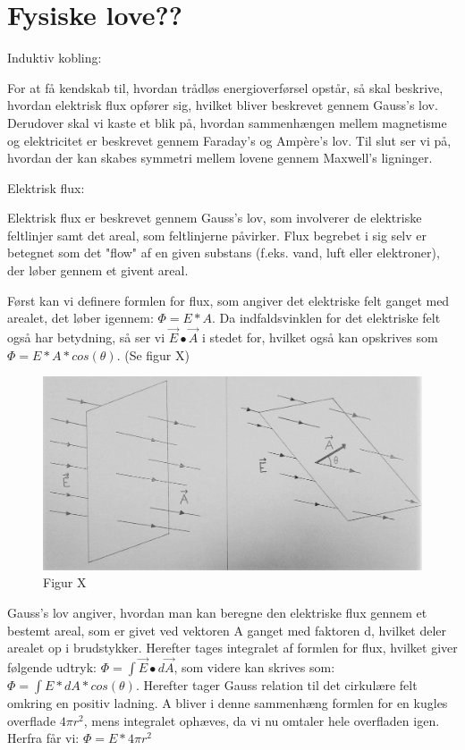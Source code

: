 \section{Fysiske love??}

Induktiv kobling:

For at få kendskab til, hvordan trådløs energioverførsel opstår, så skal beskrive, hvordan elektrisk flux opfører sig, hvilket bliver beskrevet gennem Gauss's lov. Derudover skal vi kaste et blik på, hvordan sammenhængen mellem magnetisme og elektricitet er beskrevet gennem Faraday's og Ampère's lov. Til slut ser vi på, hvordan der kan skabes symmetri mellem lovene gennem Maxwell's ligninger.

Elektrisk flux:

Elektrisk flux er beskrevet gennem Gauss's lov, som involverer de elektriske feltlinjer samt det areal, som feltlinjerne påvirker. Flux begrebet i sig selv er betegnet som det "flow" af en given substans (f.eks. vand, luft eller elektroner), der løber gennem et givent areal.

Først kan vi definere formlen for flux, som angiver det elektriske felt ganget med arealet, det løber igennem: $\Phi = E * A$. Da indfaldsvinklen for det elektriske felt også har betydning, så ser vi $\vec{E} \bullet \vec{A}$ i stedet for, hvilket også kan opskrives som $\Phi = E * A * cos(\theta)$. (Se figur X)

\begin{figure}[H]
\centering
\includegraphics[scale=0.5]{Vildledning/Schematics/Vinkelflux}
\caption{Figur X}
\end{figure}

Gauss's lov angiver, hvordan man kan beregne den elektriske flux gennem et bestemt areal, som er givet ved vektoren A ganget med faktoren d, hvilket deler arealet op i brudstykker. Herefter tages integralet af formlen for flux, hvilket giver følgende udtryk: $\Phi = \int \vec{E} \bullet d \vec{A}$, som videre kan skrives som: $\Phi = \int E * dA * cos(\theta)$. Herefter tager Gauss relation til det cirkulære felt omkring en positiv ladning. A bliver i denne sammenhæng formlen for en kugles overflade $4 \pi r^2$, mens integralet ophæves, da vi nu omtaler hele overfladen igen. Herfra får vi: $\Phi = E * 4 \pi r^2$

